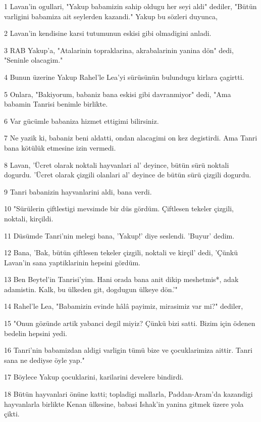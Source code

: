 \par 1 Lavan'in ogullari, "Yakup babamizin sahip oldugu her seyi aldi" dediler, "Bütün varligini babamiza ait seylerden kazandi." Yakup bu sözleri duyunca,
\par 2 Lavan'in kendisine karsi tutumunun eskisi gibi olmadigini anladi.
\par 3 RAB Yakup'a, "Atalarinin topraklarina, akrabalarinin yanina dön" dedi, "Seninle olacagim."
\par 4 Bunun üzerine Yakup Rahel'le Lea'yi sürüsünün bulundugu kirlara çagirtti.
\par 5 Onlara, "Bakiyorum, babaniz bana eskisi gibi davranmiyor" dedi, "Ama babamin Tanrisi benimle birlikte.
\par 6 Var gücümle babaniza hizmet ettigimi bilirsiniz.
\par 7 Ne yazik ki, babaniz beni aldatti, ondan alacagimi on kez degistirdi. Ama Tanri bana kötülük etmesine izin vermedi.
\par 8 Lavan, 'Ücret olarak noktali hayvanlari al' deyince, bütün sürü noktali dogurdu. 'Ücret olarak çizgili olanlari al' deyince de bütün sürü çizgili dogurdu.
\par 9 Tanri babanizin hayvanlarini aldi, bana verdi.
\par 10 "Sürülerin çiftlestigi mevsimde bir düs gördüm. Çiftlesen tekeler çizgili, noktali, kirçildi.
\par 11 Düsümde Tanri'nin melegi bana, 'Yakup!' diye seslendi. 'Buyur' dedim.
\par 12 Bana, 'Bak, bütün çiftlesen tekeler çizgili, noktali ve kirçil' dedi, 'Çünkü Lavan'in sana yaptiklarinin hepsini gördüm.
\par 13 Ben Beytel'in Tanrisi'yim. Hani orada bana anit dikip meshetmis*, adak adamistin. Kalk, bu ülkeden git, dogdugun ülkeye dön.'"
\par 14 Rahel'le Lea, "Babamizin evinde hâlâ payimiz, mirasimiz var mi?" dediler,
\par 15 "Onun gözünde artik yabanci degil miyiz? Çünkü bizi satti. Bizim için ödenen bedelin hepsini yedi.
\par 16 Tanri'nin babamizdan aldigi varligin tümü bize ve çocuklarimiza aittir. Tanri sana ne dediyse öyle yap."
\par 17 Böylece Yakup çocuklarini, karilarini develere bindirdi.
\par 18 Bütün hayvanlari önüne katti; topladigi mallarla, Paddan-Aram'da kazandigi hayvanlarla birlikte Kenan ülkesine, babasi Ishak'in yanina gitmek üzere yola çikti.
